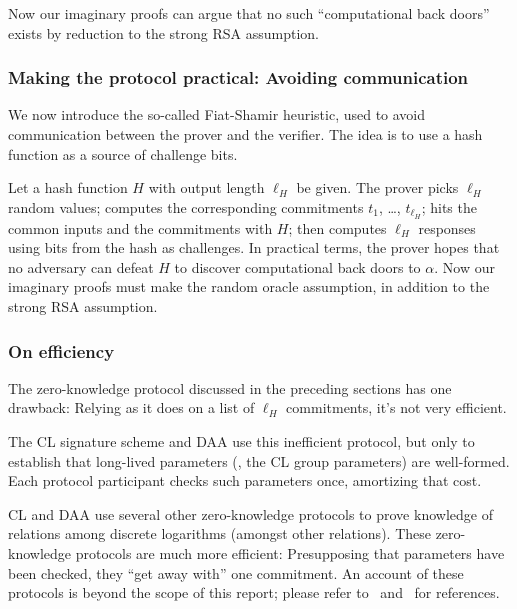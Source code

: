 Now our imaginary proofs can argue that no such ``computational
back doors'' exists by reduction to the strong RSA assumption.

\subsubsection{Making the protocol practical: Avoiding communication}

We now introduce the so-called Fiat-Shamir heuristic, used to avoid
communication between the prover and the verifier.
The idea is to use a hash function as a source of challenge bits.

Let a hash function $H$ with output length $\ell_H$ be given.
The prover picks $\ell_H$ random values; computes the corresponding
commitments $t_1$, \ldots, $t_{\ell_H}$;
hits the common inputs and the commitments with $H$;
then computes $\ell_H$ responses using bits from
the hash as challenges. In practical terms, the prover hopes
that no adversary can defeat $H$ to discover
computational back doors to $\alpha$. Now our imaginary proofs must
make the random oracle assumption, in addition to the strong
RSA assumption.

\subsubsection{On efficiency}

The zero-knowledge protocol discussed in the preceding sections has one
drawback: Relying as it does on a list of $\ell_H$ commitments, it's not
very efficient.

The CL signature scheme and DAA use this inefficient protocol,
but only to establish that long-lived parameters (\eg, the CL group
parameters) are well-formed.
Each protocol participant checks such parameters once, amortizing that cost.

CL and DAA use several other zero-knowledge protocols to prove knowledge
of relations among discrete logarithms (amongst other relations).
These zero-knowledge protocols
are much more efficient: Presupposing that parameters have been
checked, they ``get away with'' one commitment.
An account of these protocols is beyond the scope of this report;
please refer to~\cite[\S\/5]{cl} and~\cite[\S\/3.2]{daa} for references.
